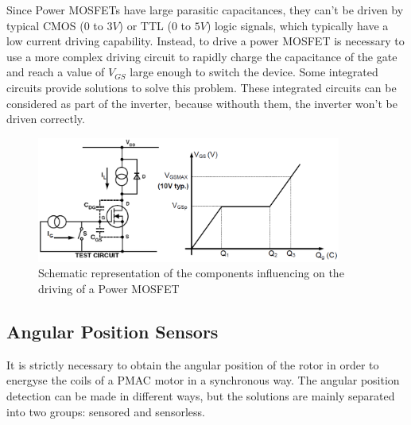 Since Power \ac{MOSFET}s have large parasitic capacitances, they can't be driven by typical CMOS ($0$ to $3V$) or TTL ($0$ to $5V$) logic signals, which typically have a low current driving capability. Instead, to drive a power \ac{MOSFET} is necessary to use a more complex driving circuit to rapidly charge the capacitance of the gate and reach a value of $V_{GS}$ large enough to switch the device. Some integrated circuits provide solutions to solve this problem. These integrated circuits can be considered as part of the inverter, because withouth them, the inverter won't be driven correctly.

\begin{figure}[htbp]
\centering
\includegraphics[width=10cm]{Images/mosfet_drive.png} 
\caption[MOSFET Driving Diagram]{Schematic representation of the components influencing on the driving of a Power MOSFET}
\label{fig:mosfet_drive}
\end{figure}

\subsection{Angular Position Sensors}

It is strictly necessary to obtain the angular position of the rotor in order to energyse the coils of a \ac{PMAC} motor in a synchronous way. The angular position detection can be made in different ways, but the solutions are mainly separated into two groups: sensored and sensorless.

